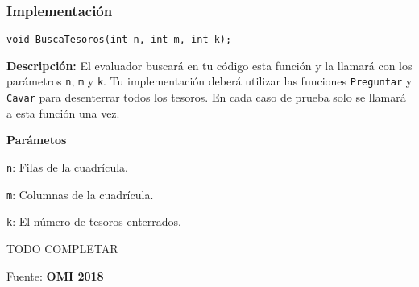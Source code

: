 \subsubsection*{Implementación}
\verb|void BuscaTesoros(int n, int m, int k);|

\textbf{Descripción:} El evaluador buscará en tu código esta función y la llamará con los parámetros \verb|n|, \verb|m| y \verb|k|. Tu implementación deberá utilizar las funciones \verb|Preguntar| y \verb|Cavar| para desenterrar todos los tesoros. En cada caso de prueba solo se llamará a esta función una vez.

\textbf{Parámetos}
\vspace{-\baselineskip}
\begin{plimits}
	\item \verb|n|: Filas de la cuadrícula.
	\item \verb|m|: Columnas de la cuadrícula.
	\item \verb|k|:  El número de tesoros enterrados.
\end{plimits}

TODO COMPLETAR

Fuente: \textbf{OMI 2018}


\problembreak

\problemtitle

